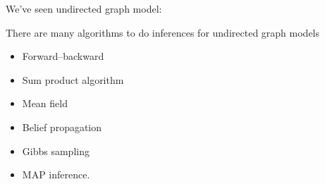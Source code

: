 \documentclass{article}
\begin{document}

We've seen undirected graph model:
\begin{center}
\end{center}
There are many algorithms to do inferences for undirected graph models
\begin{itemize}
\item Forward--backward
\item Sum product algorithm
\item Mean field
\item Belief propagation
\item Gibbs sampling
\item MAP inference.
\end{itemize}
\end{document}
